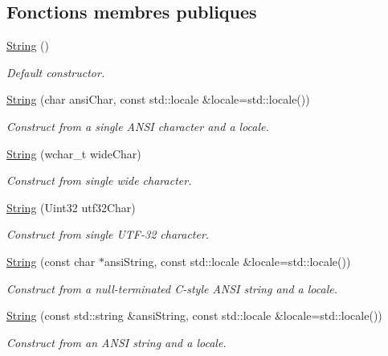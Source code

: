 \subsection*{Fonctions membres publiques}
\begin{DoxyCompactItemize}
\item 
\hyperlink{classsf_1_1String_a9563a4e93f692e0c8e8702b374ef8692}{String} ()
\begin{DoxyCompactList}\small\item\em Default constructor. \end{DoxyCompactList}\item 
\hyperlink{classsf_1_1String_ac9df7f7696cff164794e338f3c89ccc5}{String} (char ansi\+Char, const std\+::locale \&locale=std\+::locale())
\begin{DoxyCompactList}\small\item\em Construct from a single A\+N\+SI character and a locale. \end{DoxyCompactList}\item 
\hyperlink{classsf_1_1String_aefaa202d2aa5ff85b4f75a5983367e86}{String} (wchar\+\_\+t wide\+Char)
\begin{DoxyCompactList}\small\item\em Construct from single wide character. \end{DoxyCompactList}\item 
\hyperlink{classsf_1_1String_a8e1a5027416d121187908e2ed77079ff}{String} (Uint32 utf32\+Char)
\begin{DoxyCompactList}\small\item\em Construct from single U\+T\+F-\/32 character. \end{DoxyCompactList}\item 
\hyperlink{classsf_1_1String_a57d2b8c289f9894f859564cad034bfc7}{String} (const char $\ast$ansi\+String, const std\+::locale \&locale=std\+::locale())
\begin{DoxyCompactList}\small\item\em Construct from a null-\/terminated C-\/style A\+N\+SI string and a locale. \end{DoxyCompactList}\item 
\hyperlink{classsf_1_1String_a0aa41dcbd17b0c36c74d03d3b0147f1e}{String} (const std\+::string \&ansi\+String, const std\+::locale \&locale=std\+::locale())
\begin{DoxyCompactList}\small\item\em Construct from an A\+N\+SI string and a locale. \end{DoxyCompactList}\item 

\end{DoxyCompactItemize}
